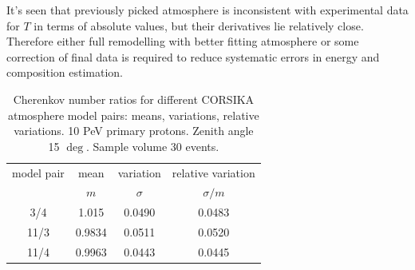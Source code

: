 \documentclass[final,5p,times,twocolumn]{elsarticle}
\begin{document}
It's seen that previously picked atmosphere is inconsistent with experimental data for $T$ in terms of absolute values, but their derivatives lie relatively close. Therefore either full remodelling with better fitting atmosphere or some correction of final data is required to reduce systematic errors in energy and composition estimation.

\begin{table}[t]
\centering
\caption{Cherenkov number ratios for different CORSIKA atmosphere model pairs: means, variations, relative variations. 10 PeV primary protons. Zenith angle 15 $\deg$. Sample volume 30 events.}
\label{tab:atmmod}
\vspace{1pc}
\begin{tabular}{|c||c|c|c|}
\hline
model pair  & mean &  variation   & relative variation \\ 
            &  $m$ & $\sigma$     & $\sigma/m$          \\ 
\hline 
\hline 
 3/4 &  1.015    &  0.0490     &   0.0483   \\
\hline
11/3 &  0.9834    &  0.0511     &   0.0520    \\
\hline
11/4 &  0.9963    &  0.0443     &   0.0445    \\
\hline
\end{tabular}
\end{table}
\end{document}
